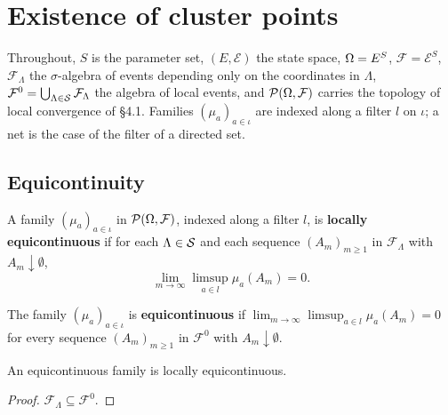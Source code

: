 \section{Existence of cluster points}

Throughout, $S$ is the parameter set, $(E, \mathcal{E})$ the state space, $\Omega = E^S$,
$\mathcal{F} = \mathcal{E}^S$, $\mathcal{F}_\Lambda$ the $\sigma$-algebra of events depending
only on the coordinates in $\Lambda$,
$\mathcal{F}^0 = \bigcup_{\Lambda \in \mathcal{S}} \mathcal{F}_\Lambda$ the algebra of local events, and
$\mathcal{P}(\Omega, \mathcal{F})$ carries the topology of local convergence of \S4.1. Families
$(\mu_a)_{a \in \iota}$ are indexed along a filter $l$ on $\iota$; a net is the case of the
filter of a directed set.

\subsection*{Equicontinuity}

\begin{definition}
    \label{def:cp-loc-equi}
    \leanok

    A family $(\mu_a)_{a \in \iota}$ in $\mathcal{P}(\Omega, \mathcal{F})$, indexed along a filter $l$,
    is \textbf{locally equicontinuous} if for each $\Lambda \in \mathcal{S}$ and each sequence
    $(A_m)_{m \geq 1}$ in $\mathcal{F}_\Lambda$ with $A_m \downarrow \emptyset$,
    \[\lim_{m \to \infty} \limsup_{a \in l} \mu_a(A_m) = 0.\]
\end{definition}

\begin{definition}
    \label{def:cp-equi}
    \leanok

    The family $(\mu_a)_{a \in \iota}$ is \textbf{equicontinuous} if
    $\lim_{m \to \infty} \limsup_{a \in l} \mu_a(A_m) = 0$ for every sequence
    $(A_m)_{m \geq 1}$ in $\mathcal{F}^0$ with $A_m \downarrow \emptyset$.
\end{definition}

\begin{lemma}
    \label{lem:cp-equi-loc-equi}
    \leanok

    An equicontinuous family is locally equicontinuous.
\end{lemma}
\begin{proof}
    \leanok

    $\mathcal{F}_\Lambda \subseteq \mathcal{F}^0$.
\end{proof}

